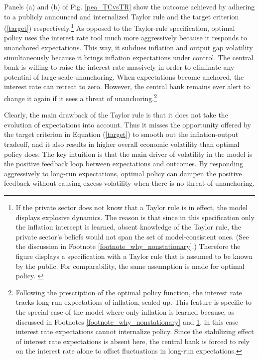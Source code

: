 \documentclass[11pt]{article}
\renewcommand{\[}{\begin{equation}}
\renewcommand{\]}{\end{equation}}
\begin{document}
Panels (a) and (b) of Fig. \ref{pea_TCvsTR} show the outcome achieved by adhering to a publicly announced and internalized Taylor rule and the target criterion (\ref{target}) respectively.\footnote{If the private sector does not know that a Taylor rule is in effect, the model displays explosive dynamics. The reason is that since in this specification only the inflation intercept is learned, absent knowledge of the Taylor rule, the private sector's beliefs would not span the set of model-consistent ones. (See the discussion in Footnote \ref{footnote_why_nonstationary}.) Therefore the figure displays a specification with a Taylor rule that is assumed to be known by the public. For comparability, the same assumption is made for optimal policy. %
\label{footnote_i_expectations} }
As opposed to the Taylor-rule specification, optimal policy uses the interest rate tool much more aggressively because it responds to unanchored expectations. This way, it subdues inflation and output gap volatility simultaneously because it brings inflation expectations under control. The central bank is willing to raise the interest rate massively in order to eliminate any potential of large-scale unanchoring. When expectations become anchored, the interest rate can retreat to zero. However, the central bank remains ever alert to change it again if it sees a threat of unanchoring.\footnote{Following the prescription of the optimal policy function, the interest rate tracks long-run expectations of inflation, scaled up. This feature is specific to the special case of the model where only inflation is learned because, as discussed in Footnotes \ref{footnote_why_nonstationary} and \ref{footnote_i_expectations}, in this case interest rate expectations cannot internalize policy. Since the stabilizing effect of interest rate expectations is absent here, the central bank is forced to rely on the interest rate alone to offset fluctuations in long-run expectations.}

Clearly, the main drawback of the Taylor rule is that it does not take the evolution of expectations into account. Thus it misses the opportunity offered by the target criterion in Equation (\ref{target}) to smooth out the inflation-output tradeoff, and it also results in higher overall economic volatility than optimal policy does. The key intuition is that the main driver of volatility in the model is the positive feedback loop between expectations and outcomes. By responding aggressively to long-run expectations, optimal policy can dampen the positive feedback without causing excess volatility when there is no threat of unanchoring. 
\end{document}
